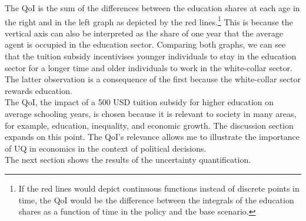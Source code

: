 \noindent
The QoI is the sum of the differences between the education shares at each age in the right and in the left graph as depicted by the red lines.\footnote{If the red lines would depict continuous functions instead of discrete points in time, the QoI would be the difference between the integrals of the education shares as a function of time in the policy and the base scenario.} This is because the vertical axis can also be interpreted as the share of one year that the average agent is occupied in the education sector. Comparing both graphs, we can see that the tuition subsidy incentivises younger individuals to stay in the education sector for a longer time and older individuals to work in the white-collar sector. The latter observation is a consequence of the first because the white-collar sector rewards education.\\
\newline
The QoI, the impact of a 500 USD tuition subsidy for higher education on average schooling years, is chosen because it is relevant to society in many areas, for example, education, inequality, and economic growth. The discussion section expands on this point. The QoI's relevance allows me to illustrate the importance of UQ in economics in the context of political decisions.\\
\newline
The next section shows the results of the uncertainty quantification.
